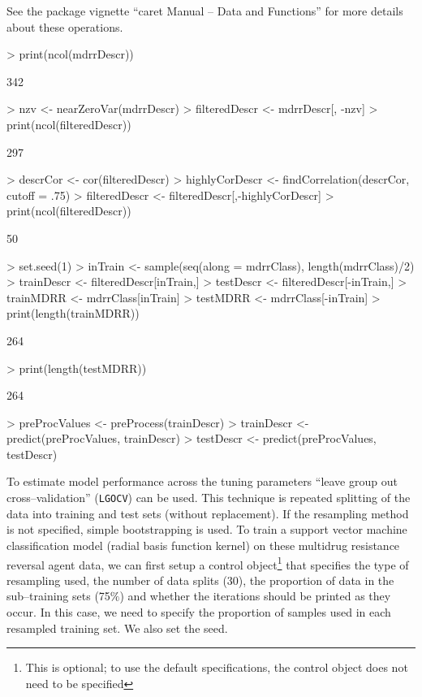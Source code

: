 \documentclass[12pt]{article}
\begin{document}
See the package vignette ``caret Manual -- Data and Functions'' for more details about these operations.

\begin{small}
\begin{Schunk}
\begin{Sinput}
> print(ncol(mdrrDescr))
\end{Sinput}
\begin{Soutput}
[1] 342
\end{Soutput}
\begin{Sinput}
> nzv <- nearZeroVar(mdrrDescr)
> filteredDescr <- mdrrDescr[, -nzv]
> print(ncol(filteredDescr))
\end{Sinput}
\begin{Soutput}
[1] 297
\end{Soutput}
\begin{Sinput}
> descrCor <- cor(filteredDescr)
> highlyCorDescr <- findCorrelation(descrCor, cutoff = .75)
> filteredDescr <- filteredDescr[,-highlyCorDescr]
> print(ncol(filteredDescr))
\end{Sinput}
\begin{Soutput}
[1] 50
\end{Soutput}
\begin{Sinput}
> set.seed(1)
> inTrain <- sample(seq(along = mdrrClass), length(mdrrClass)/2)
> trainDescr <- filteredDescr[inTrain,]
> testDescr <- filteredDescr[-inTrain,]
> trainMDRR <- mdrrClass[inTrain]
> testMDRR <- mdrrClass[-inTrain]
> print(length(trainMDRR))
\end{Sinput}
\begin{Soutput}
[1] 264
\end{Soutput}
\begin{Sinput}
> print(length(testMDRR))
\end{Sinput}
\begin{Soutput}
[1] 264
\end{Soutput}
\begin{Sinput}
> preProcValues <- preProcess(trainDescr)
> trainDescr <- predict(preProcValues, trainDescr)
> testDescr <-  predict(preProcValues, testDescr)
\end{Sinput}
\end{Schunk}
\end{small}

To estimate model performance across the tuning parameters ``leave group out cross--validation'' (\texttt{LGOCV}) can be used. This technique is repeated splitting of the data into training and test sets (without replacement). If the resampling method is not specified, simple bootstrapping is used. To train a support vector machine classification model (radial basis function kernel) on these multidrug resistance reversal agent data, we can first setup a control object\footnote{This is optional; to use the default specifications, the control object does not need to be specified} that specifies the type of resampling used, the number of data splits (30), the proportion of data in the sub--training sets (75$\%$) and whether the iterations should be printed as they occur. In this case, we need to specify the proportion of samples used in each resampled training set. We also set the seed.
\end{document}

